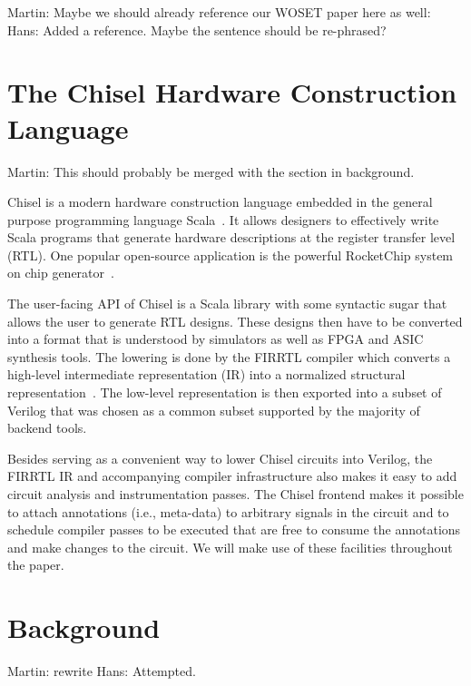 \documentclass[conference]{IEEEtran}
\newcommand{\martin}[1]{{\color{blue} Martin: #1}}
\newcommand{\hjd}[1]{{\color{pink} Hans: #1}}
\begin{document}
\martin{Maybe we should already reference our WOSET paper here as well: \cite{verify:fuzzing:2021}} \hjd{Added a reference. Maybe the sentence should be re-phrased?}


\section{The Chisel Hardware Construction Language}\label{sec:chisel}

\martin{This should probably be merged with the section in background.}

Chisel is a modern hardware construction language embedded in the general purpose programming language Scala~\cite{bachrach2012chisel, chisel:book}.
It allows designers to effectively write Scala programs that generate hardware descriptions at the register transfer level (RTL).
One popular open-source application is the powerful RocketChip system on chip generator~\cite{rocketchip}.

The user-facing API of Chisel is a Scala library with some syntactic sugar that allows the user to generate RTL designs.
These designs then have to be converted into a format that is understood by simulators as well as FPGA and ASIC synthesis tools.
The lowering is done by the FIRRTL compiler which converts a high-level intermediate representation (IR) into a normalized structural representation~\cite{izraelevitz2017firrtl}.
The low-level representation is then exported into a subset of Verilog that was chosen as a common subset supported by the majority of backend tools.

Besides serving as a convenient way to lower Chisel circuits into Verilog, the FIRRTL IR and accompanying compiler infrastructure
also makes it easy to add circuit analysis and instrumentation passes.
The Chisel frontend makes it possible to attach annotations (i.e., meta-data) to arbitrary signals in the circuit and to schedule compiler passes
to be executed that are free to consume the annotations and make changes to the circuit.
We will make use of these facilities throughout the paper.


\section{Background}
\label{sec:background}

\martin{rewrite} \hjd{Attempted.}
\end{document}
